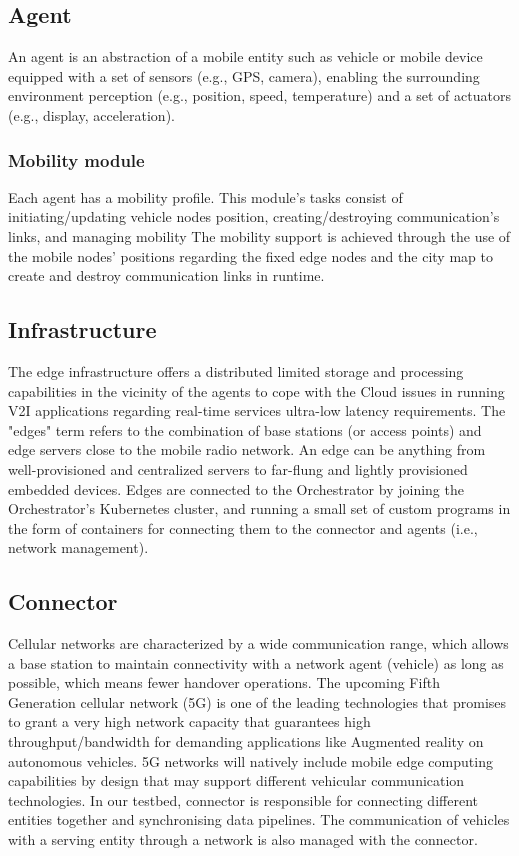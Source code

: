 \documentclass[conference]{IEEEtran}
\begin{document}
\subsection{Agent}
\par An agent is an abstraction of a mobile entity such as vehicle or mobile device equipped with a set of sensors (e.g., GPS, camera), enabling the surrounding environment perception (e.g., position, speed, temperature) and a set of actuators (e.g., display, acceleration). 
\subsubsection{Mobility module}
\par Each agent has a mobility profile. This module's tasks consist of initiating/updating vehicle nodes position, creating/destroying communication's links, and managing mobility
The mobility support is achieved through the use of the mobile nodes’ positions regarding the fixed edge nodes and the city map to create and destroy communication links in runtime.
\subsection{Infrastructure}
\par The edge infrastructure offers a distributed limited storage and processing capabilities in the vicinity of the agents to cope with the Cloud issues in running V2I applications regarding real-time services ultra-low latency requirements.
The "edges" term refers to the combination of base stations (or access points) and edge servers close to the mobile radio network. An edge can be anything from well-provisioned and centralized servers to far-flung and lightly provisioned embedded devices. Edges are connected to the Orchestrator by joining the Orchestrator's Kubernetes cluster, and running a small set of custom programs in the form of containers for connecting them to the connector and agents (i.e., network management).
\subsection{Connector} 
\par Cellular networks are characterized by a wide communication range, which allows a base station to maintain connectivity with a network agent (vehicle) as long as possible, which means fewer handover operations. The upcoming Fifth Generation cellular network (5G) is one of the leading technologies that promises to grant a very high network capacity that guarantees high throughput/bandwidth for demanding applications like Augmented reality on autonomous vehicles. 5G networks will natively include mobile edge computing capabilities by design that may support different vehicular communication technologies. In our testbed, connector is responsible for connecting different entities together and synchronising data pipelines. The communication of vehicles with a serving entity through a network is also managed with the connector.
\end{document}

